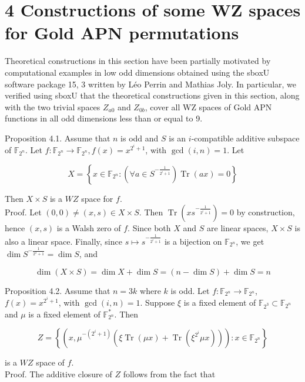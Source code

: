 \documentclass[10pt]{article}
\begin{document}
\section*{4 Constructions of some WZ spaces for Gold APN permutations}
Theoretical constructions in this section have been partially motivated by computational examples in low odd dimensions obtained using the sboxU software package 15, 3 written by Léo Perrin and Mathias Joly. In particular, we verified using sboxU that the theoretical constructions given in this section, along with the two trivial spaces $Z_{a 0}$ and $Z_{0 b}$, cover all WZ spaces of Gold APN functions in all odd dimensions less than or equal to 9.

Proposition 4.1. Assume that $n$ is odd and $S$ is an $i$-compatible additive subspace of $\mathbb{F}_{2^{n}}$. Let $f: \mathbb{F}_{2^{n}} \rightarrow \mathbb{F}_{2^{n}}, f(x)=x^{2^{i}+1}$, with $\operatorname{gcd}(i, n)=1$. Let

$$
X=\left\{x \in \mathbb{F}_{2^{n}}:\left(\forall a \in S^{-\frac{1}{2^{i}+1}}\right) \operatorname{Tr}(a x)=0\right\}
$$

Then $X \times S$ is a $W Z$ space for $f$.\\
Proof. Let $(0,0) \neq(x, s) \in X \times S$. Then $\operatorname{Tr}\left(x s^{-\frac{1}{2^{i}+1}}\right)=0$ by construction, hence $(x, s)$ is a Walsh zero of $f$. Since both $X$ and $S$ are linear spaces, $X \times S$ is also a linear space. Finally, since $s \mapsto s^{-\frac{1}{2^{i}+1}}$ is a bijection on $\mathbb{F}_{2^{n}}$, we get $\operatorname{dim} S^{-\frac{1}{2^{2}+1}}=\operatorname{dim} S$, and

$$
\operatorname{dim}(X \times S)=\operatorname{dim} X+\operatorname{dim} S=(n-\operatorname{dim} S)+\operatorname{dim} S=n
$$

Proposition 4.2. Assume that $n=3 k$ where $k$ is odd. Let $f: \mathbb{F}_{2^{n}} \rightarrow \mathbb{F}_{2^{n}}$, $f(x)=x^{2^{i}+1}$, with $\operatorname{gcd}(i, n)=1$. Suppose $\xi$ is a fixed element of $\mathbb{F}_{2^{3}} \subset \mathbb{F}_{2^{n}}$ and $\mu$ is a fixed element of $\mathbb{F}_{2^{n}}^{*}$. Then

$$
Z=\left\{\left(x, \mu^{-\left(2^{i}+1\right)}\left(\xi \operatorname{Tr}(\mu x)+\operatorname{Tr}\left(\xi^{2^{i}} \mu x\right)\right)\right): x \in \mathbb{F}_{2^{n}}\right\}
$$

is a $W Z$ space of $f$.\\
Proof. The additive closure of $Z$ follows from the fact that
\end{document}
